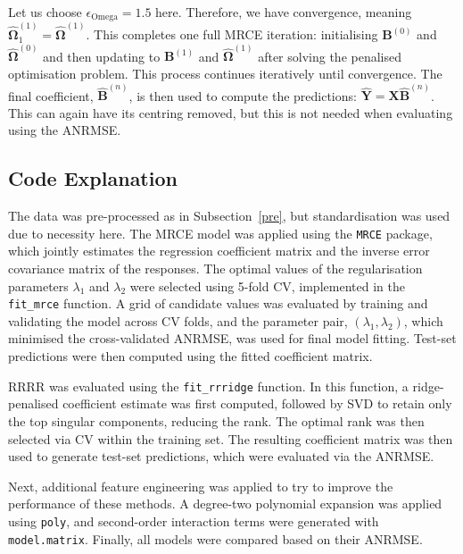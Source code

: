 \documentclass[11pt]{report} %
\begin{document}
\noindent Let us choose $\epsilon_\text{Omega} = 1.5$ here. Therefore, we have convergence, meaning $\mathbf{\hat{\Omega}}^{(1)}_1 = \mathbf{\hat{\Omega}}^{(1)}$. This completes one full MRCE iteration: initialising \(\mathbf{B}^{(0)}\) and \( \hat{\mathbf{\Omega}}^{(0)}\) and then updating to \(\mathbf{B}^{(1)}\) and \( \hat{\mathbf{\Omega}}^{(1)}\) after solving the penalised optimisation problem. This process continues iteratively until convergence. The final coefficient, \(\mathbf{\hat{B}}^{(n)}\), is then used to compute the predictions: $\mathbf{\hat{Y}} = \mathbf{X}\mathbf{\hat{B}}^{(n)}$. This can again have its centring removed, but this is not needed when evaluating using the ANRMSE.

\vspace{-0.3cm}
\subsection{Code Explanation}
The data was pre-processed as in Subsection~\ref{pre}, but standardisation was used due to necessity here. The MRCE model was applied using the \texttt{MRCE} package, which jointly estimates the regression coefficient matrix and the inverse error covariance matrix of the responses. The optimal values of the regularisation parameters \( \lambda_1 \) and \( \lambda_2 \) were selected using 5-fold CV, implemented in the \texttt{fit\_mrce} function. A grid of candidate values was evaluated by training and validating the model across CV folds, and the parameter pair, $(\lambda_1, \lambda_2)$, which minimised the cross-validated ANRMSE, was used for final model fitting. Test-set predictions were then computed using the fitted coefficient matrix.

RRRR was evaluated using the \texttt{fit\_rrridge} function. In this function, a ridge-penalised coefficient estimate was first computed, followed by SVD to retain only the top singular components, reducing the rank. The optimal rank was then selected via CV within the training set. The resulting coefficient matrix was then used to generate test-set predictions, which were evaluated via the ANRMSE.

Next, additional feature engineering was applied to try to improve the performance of these methods. A degree-two polynomial expansion was applied using \texttt{poly}, and second-order interaction terms were generated with \texttt{model.matrix}. Finally, all models were compared based on their ANRMSE. 
\end{document}
